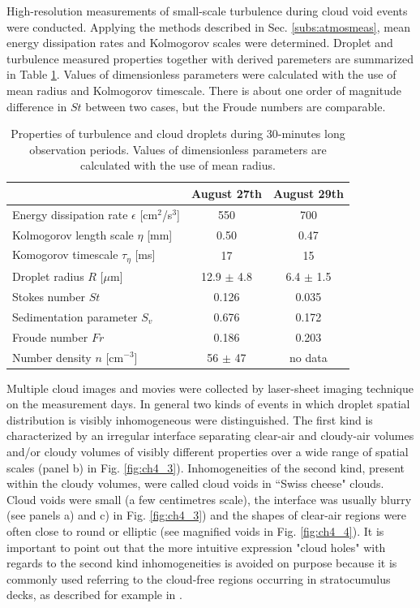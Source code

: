\documentclass[../main.tex]{subfiles}
\begin{document}
High-resolution measurements of small-scale turbulence during cloud void events were conducted. Applying the methods described in Sec. \autoref{subs:atmosmeas}, mean energy dissipation rates and Kolmogorov scales were determined. Droplet and turbulence measured properties together with derived paremeters are summarized in Table \ref{tab:ch4_1}. Values of dimensionless parameters were calculated with the use of mean radius and Kolmogorov timescale. There is about one order of magnitude difference in $St$ between two cases, but the Froude numbers are comparable.

\begin{table}
\small
\tabcolsep=0.2cm
\caption{Properties of turbulence and cloud droplets during 30-minutes long observation periods. Values of dimensionless parameters are calculated with the use of mean radius.}
\centering
\begin{tabular}{|l|c|c|}
\hline
  & August 27th & August 29th\\
\hline
 Energy dissipation rate $\epsilon$ [cm$^2$/s$^3$] & 550 & 700 \\
\hline
 Kolmogorov length scale $\eta$ [mm] & 0.50  & 0.47\\
\hline
Komogorov timescale $\tau_{\eta}$ [ms] & 17 & 15\\
\hline
Droplet radius $R$ [$\mu$m] & 12.9 $\pm$ 4.8 & 6.4 $\pm$ 1.5\\
\hline
 Stokes number $St$ & 0.126  & 0.035\\
\hline
 Sedimentation parameter $S_v$ & 0.676  & 0.172\\
 \hline
 Froude number $Fr$ & 0.186  & 0.203\\
 \hline
 Number density $n$ [cm$^{-3}$] & 56 $\pm$ 47 & no data\\
 \hline
\end{tabular}
\label{tab:ch4_1}
\end{table}

Multiple cloud images and movies were collected by laser-sheet imaging technique on the measurement days. In general two kinds of events in which droplet spatial distribution is visibly inhomogeneous were distinguished. The first kind is characterized by an irregular interface separating clear-air and cloudy-air volumes and/or cloudy volumes of visibly different properties over a wide range of spatial scales (panel b) in Fig. \ref{fig:ch4_3}). Inhomogeneities of the second kind, present within the cloudy volumes, were called cloud voids in ``Swiss cheese" clouds. Cloud voids were small (a few centimetres scale), the interface was usually blurry (see panels a) and c) in Fig. \ref{fig:ch4_3}) and the shapes of clear-air regions were often close to round or elliptic (see magnified voids in Fig. \ref{fig:ch4_4}). It is important to point out that the more intuitive expression "cloud holes" with regards to the second kind inhomogeneities is avoided on purpose because it is commonly used referring to the cloud-free regions occurring in stratocumulus decks, as described for example in \citet{Gerber_2005}.
\end{document}

